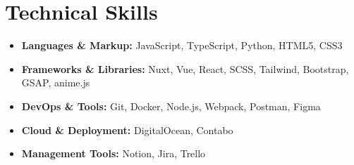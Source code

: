 \section*{Technical Skills}
%
%
%
\begin{itemize}
    \item \textbf{Languages \& Markup:} JavaScript, TypeScript, Python, HTML5, CSS3
    \item \textbf{Frameworks \& Libraries:} Nuxt, Vue, React, SCSS, Tailwind, Bootstrap, GSAP, anime.js
    \item \textbf{DevOps \& Tools:} Git, Docker, Node.js, Webpack, Postman, Figma
    \item \textbf{Cloud \& Deployment:} DigitalOcean, Contabo
    \item \textbf{Management Tools:} Notion, Jira, Trello
\end{itemize}